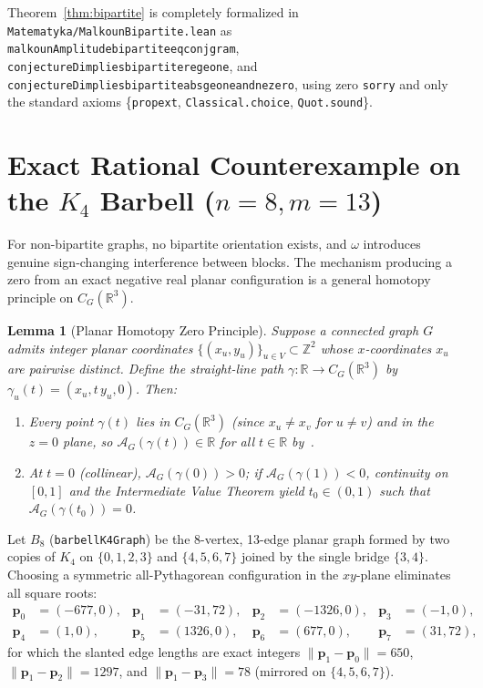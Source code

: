 \documentclass[11pt]{amsart}
\renewcommand{\_}{\origunderscore\penalty0\relax}
\theoremstyle{plain}
\newtheorem{lemma}[theorem]{Lemma}
\theoremstyle{definition}
\theoremstyle{remark}
\newcommand{\R}{\mathbb{R}}
\newcommand{\Z}{\mathbb{Z}}
\newcommand{\AG}{\mathcal{A}_G}
\begin{document}
Theorem~\ref{thm:bipartite} is completely formalized in \texttt{Matematyka/MalkounBipartite.lean} as \texttt{malkounAmplitude\_bipartite\_eq\_conj\_gram}, \texttt{conjectureD\_implies\_bipartite\_re\_ge\_one}, and \texttt{conjectureD\_implies\_bipartite\_abs\_ge\_one\_and\_ne\_zero}, using zero \texttt{sorry} and only the standard axioms \{\texttt{propext}, \texttt{Classical.choice}, \texttt{Quot.sound}\}.

\section{Exact Rational Counterexample on the $K_4$ Barbell ($n=8, m=13$)}\label{sec:barbell}

For non-bipartite graphs, no bipartite orientation exists, and $\omega$ introduces genuine sign-changing interference between blocks. The mechanism producing a zero from an exact negative real planar configuration is a general homotopy principle on $C_G(\R^3)$.

\begin{lemma}[Planar Homotopy Zero Principle]\label{lem:ivt}
Suppose a connected graph $G$ admits integer planar coordinates $\{(x_u, y_u)\}_{u \in V} \subset \Z^2$ whose $x$-coordinates $x_u$ are pairwise distinct. Define the straight-line path $\gamma : \R \to C_G(\R^3)$ by $\gamma_u(t) = (x_u, t\,y_u, 0)$. Then:
\begin{enumerate}
    \item Every point $\gamma(t)$ lies in $C_G(\R^3)$ (since $x_u \neq x_v$ for $u \neq v$) and in the $z=0$ plane, so $\AG(\gamma(t)) \in \R$ for all $t \in \R$ by~\cite[Proposition~2.7]{Malkoun2026}.
    \item At $t = 0$ (collinear), $\AG(\gamma(0)) > 0$; if $\AG(\gamma(1)) < 0$, continuity on $[0, 1]$ and the Intermediate Value Theorem yield $t_0 \in (0, 1)$ such that $\AG(\gamma(t_0)) = 0$.
\end{enumerate}
\end{lemma}

Let $B_8$ (\texttt{barbellK4Graph}) be the 8-vertex, 13-edge planar graph formed by two copies of $K_4$ on $\{0,1,2,3\}$ and $\{4,5,6,7\}$ joined by the single bridge $\{3, 4\}$. Choosing a symmetric all-Pythagorean configuration in the $xy$-plane eliminates all square roots:
\[
\begin{aligned}
    \mathbf{p}_0 &= (-677, 0), & \mathbf{p}_1 &= (-31, 72), & \mathbf{p}_2 &= (-1326, 0), & \mathbf{p}_3 &= (-1, 0), \\
    \mathbf{p}_4 &= (1, 0), & \mathbf{p}_5 &= (1326, 0), & \mathbf{p}_6 &= (677, 0), & \mathbf{p}_7 &= (31, 72),
\end{aligned}
\]
for which the slanted edge lengths are exact integers $\|\mathbf{p}_1 - \mathbf{p}_0\| = 650$, $\|\mathbf{p}_1 - \mathbf{p}_2\| = 1297$, and $\|\mathbf{p}_1 - \mathbf{p}_3\| = 78$ (mirrored on $\{4,5,6,7\}$).
\end{document}
